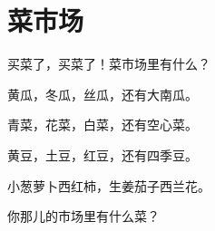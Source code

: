 \documentclass[12pt,UTF-8,openany]{ctexbook}
\begin{document}
\hanzibox{}\hanzibox{}\hanzibox{}\hanzibox{}\hspace{1em}\hanzibox{}\hanzibox{}\hanzibox{}\hanzibox{}

\hanzibox{}\hanzibox{}\hanzibox{}\hanzibox{}\hspace{1em}\hanzibox{}\hanzibox{}\hanzibox{}\hanzibox{}






\chapter{菜市场}

\begin{large}
    
    买菜了，买菜了！菜市场里有什么？
    
    黄瓜，冬瓜，丝瓜，还有大南瓜。
    
    青菜，花菜，白菜，还有空心菜。
    
    黄豆，土豆，红豆，还有四季豆。
    
    小葱萝卜西红柿，生姜茄子西兰花。
    
    你那儿的市场里有什么菜？
    
\end{large}


\clearpage

\begin{center}
    
    
\end{center}


\hanzibox{}\hanzibox{}\hanzibox{}\hanzibox{}\hspace{1em}\hanzibox{}\hanzibox{}\hanzibox{}\hanzibox{}

\hanzibox{}\hanzibox{}\hanzibox{}\hanzibox{}\hspace{1em}\hanzibox{}\hanzibox{}\hanzibox{}\hanzibox{}

\hanzibox{}\hanzibox{}\hanzibox{}\hanzibox{}\hspace{1em}\hanzibox{}\hanzibox{}\hanzibox{}\hanzibox{}

\hanzibox{}\hanzibox{}\hanzibox{}\hanzibox{}\hspace{1em}\hanzibox{}\hanzibox{}\hanzibox{}\hanzibox{}
\end{document}
